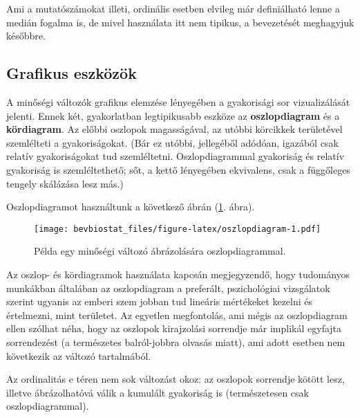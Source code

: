 \documentclass[]{book}
\newenvironment{Shaded}{\begin{snugshade}}{\end{snugshade}}
\newcommand{\KeywordTok}[1]{\textcolor[rgb]{0.13,0.29,0.53}{\textbf{#1}}}
\newcommand{\DataTypeTok}[1]{\textcolor[rgb]{0.13,0.29,0.53}{#1}}
\newcommand{\StringTok}[1]{\textcolor[rgb]{0.31,0.60,0.02}{#1}}
\newcommand{\OperatorTok}[1]{\textcolor[rgb]{0.81,0.36,0.00}{\textbf{#1}}}
\newcommand{\NormalTok}[1]{#1}
\begin{document}
Ami a mutatószámokat illeti, ordinális esetben elvileg már definiálható
lenne a medián fogalma is, de mivel használata itt nem tipikus, a
bevezetését meghagyjuk későbbre.

\subsection{Grafikus eszközök}\label{deskriptivminegyvaltgrafikus}

A minőségi változók grafikus elemzése lényegében a gyakorisági sor
vizualizálását jelenti. Ennek két, gyakorlatban legtipikusabb eszköze az
\textbf{oszlopdiagram} és a \textbf{kördiagram}. Az előbbi oszlopok
magasságával, az utóbbi körcikkek területével szemlélteti a
gyakoriságokat. (Bár ez utóbbi, jellegéből adódóan, igazából csak
relatív gyakoriságokat tud szemléltetni. Oszlopdiagrammal gyakoriság és
relatív gyakoriság is szemléltethető; sőt, a kettő lényegében
ekvivalens, csak a függőleges tengely skálázása lesz más.)

Oszlopdiagramot használtunk a következő ábrán (\ref{fig:oszlopdiagram}.
ábra).

\begin{Shaded}
\end{Shaded}

\begin{figure}
\centering
\texttt{[image: bevbiostat\_files/figure-latex/oszlopdiagram-1.pdf]}
\caption{\label{fig:oszlopdiagram}Példa egy minőségi változó ábrázolására
oszlopdiagrammal.}
\end{figure}

Az oszlop- és kördiagramok használata kapcsán megjegyzendő, hogy
tudományos munkákban általában az oszlopdiagram a preferált,
pszichológiai vizsgálatok szerint ugyanis az emberi szem jobban tud
lineáris mértékeket kezelni és értelmezni, mint területet. Az egyetlen
megfontolás, ami mégis az oszlopdiagram ellen szólhat néha, hogy az
oszlopok kirajzolási sorrendje már implikál egyfajta sorrendezést (a
természetes balról-jobbra olvasás miatt), ami adott esetben nem
következik az változó tartalmából.

Az ordinalitás e téren nem sok változást okoz: az oszlopok sorrendje
kötött lesz, illetve ábrázolhatóvá válik a kumulált gyakoriság is
(természetesen csak oszlopdiagrammal).
\end{document}
